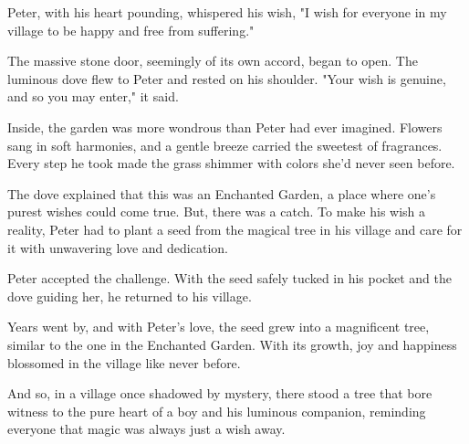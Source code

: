 \documentclass[10pt, a4paper, titlepage]{article}
\begin{document}
Peter, with his heart pounding, whispered his wish, "I wish for everyone in my village to be happy and free from suffering."

The massive stone door, seemingly of its own accord, began to open. The luminous dove flew to Peter and rested on his shoulder. "Your wish is genuine, and so you may enter," it said.

Inside, the garden was more wondrous than Peter had ever imagined. Flowers sang in soft harmonies, and a gentle breeze carried the sweetest of fragrances. Every step he took made the grass shimmer with colors she'd never seen before.

The dove explained that this was an Enchanted Garden, a place where one’s purest wishes could come true. But, there was a catch. To make his wish a reality, Peter had to plant a seed from the magical tree in his village and care for it with unwavering love and dedication.

Peter accepted the challenge. With the seed safely tucked in his pocket and the dove guiding her, he returned to his village.

Years went by, and with Peter's love, the seed grew into a magnificent tree, similar to the one in the Enchanted Garden. With its growth, joy and happiness blossomed in the village like never before.

And so, in a village once shadowed by mystery, there stood a tree that bore witness to the pure heart of a boy and his luminous companion, reminding everyone that magic was always just a wish away.
\end{document}
